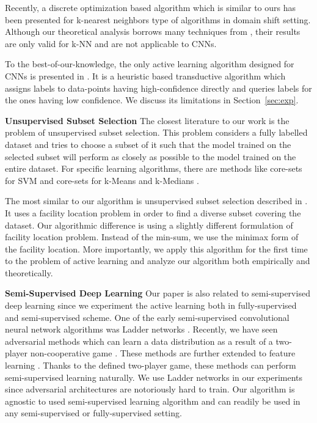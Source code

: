 \documentclass{article}
\begin{document}
Recently, a discrete optimization based algorithm \cite{BerlindU15} which is similar to ours has been presented for k-nearest neighbors type of algorithms in domain shift setting. Although our theoretical analysis borrows many techniques from \cite{BerlindU15}, their results are only valid for k-NN and are not applicable to CNNs. 

To the best-of-our-knowledge, the only active learning algorithm designed for CNNs is presented in \cite{wang2016cost}. It is a heuristic based transductive algorithm which assigns labels to data-points having high-confidence directly and queries labels for the ones having low confidence. We discuss its limitations in Section~\ref{sec:exp}.


\noindent\textbf{Unsupervised Subset Selection}
The closest literature to our work is the problem of unsupervised subset selection. This problem considers a fully labelled dataset and tries to choose a subset of it such that the model trained on the selected subset will perform as closely as possible to the model trained on the entire dataset. For specific learning algorithms, there are methods like core-sets for SVM \cite{tsang2005core} and core-sets for k-Means and k-Medians \cite{har2005smaller}. %

The most similar to our algorithm is unsupervised subset selection described in \cite{wei2013using}. It uses a facility location problem in order to find a diverse subset covering the dataset. Our algorithmic difference is using a slightly different formulation of facility location problem. Instead of the min-sum, we use the minimax \cite{facility} form of the facility location. More importantly, we apply this algorithm for the first time to the problem of active learning and analyze our algorithm both empirically and theoretically.

 
\noindent\textbf{Semi-Supervised Deep Learning}
Our paper is also related to semi-supervised deep learning since we experiment the active learning both in fully-supervised and semi-supervised scheme. 
One of the early semi-supervised convolutional neural network algorithms was Ladder networks \cite{ladder}. Recently, we have seen adversarial methods which can learn a data distribution as a result of a two-player non-cooperative game \cite{salimans2016improved,gan_original,dcgan}. These methods are further extended to feature learning \cite{ali, bigan}. Thanks to the defined two-player game, these methods can perform semi-supervised learning naturally. We use Ladder networks in our experiments since adversarial architectures are notoriously hard to train. Our algorithm is agnostic to used semi-supervised learning algorithm and can readily be used in any semi-supervised or fully-supervised setting.
\end{document}
